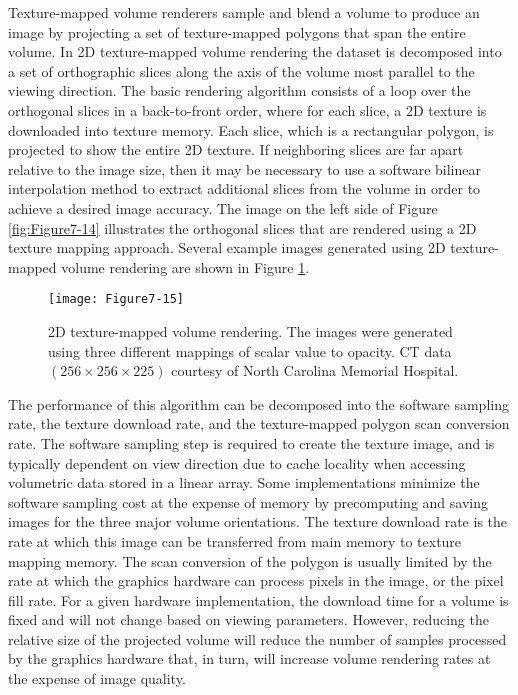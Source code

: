 Texture-mapped volume renderers sample and blend a volume to produce an image by projecting a set of texture-mapped polygons that span the entire volume. In 2D texture-mapped volume rendering the dataset is decomposed into a set of orthographic slices along the axis of the volume most parallel to the viewing direction. The basic rendering algorithm consists of a loop over the orthogonal slices in a back-to-front order, where for each slice, a 2D texture is downloaded into texture memory. Each slice, which is a rectangular polygon, is projected to show the entire 2D texture. If neighboring slices are far apart relative to the image size, then it may be necessary to use a software bilinear interpolation method to extract additional slices from the volume in order to achieve a desired image accuracy. The image on the left side of Figure \ref{fig:Figure7-14} illustrates the orthogonal slices that are rendered using a 2D texture mapping approach. Several example images generated using 2D texture-mapped volume rendering are shown in Figure \ref{fig:Figure7-15}.

\begin{figure}[!htb]
	\texttt{[image: Figure7-15]}
	\caption{2D texture-mapped volume rendering. The images were generated using three different mappings of scalar value to opacity. CT data $(256 \times 256 \times 225)$ courtesy of North Carolina Memorial Hospital.}\label{fig:Figure7-15}
\end{figure}

The performance of this algorithm can be decomposed into the software sampling rate, the texture download rate, and the texture-mapped polygon scan conversion rate. The software sampling step is required to create the texture image, and is typically dependent on view direction due to cache locality when accessing volumetric data stored in a linear array. Some implementations minimize the software sampling cost at the expense of memory by precomputing and saving images for the three major volume orientations. The texture download rate is the rate at which this image can be transferred from main memory to texture mapping memory. The scan conversion of the polygon is usually limited by the rate at which the graphics hardware can process pixels in the image, or the pixel fill rate. For a given hardware implementation, the download time for a volume is fixed and will not change based on viewing parameters. However, reducing the relative size of the projected volume will reduce the number of samples processed by the graphics hardware that, in turn, will increase volume rendering rates at the expense of image quality.

